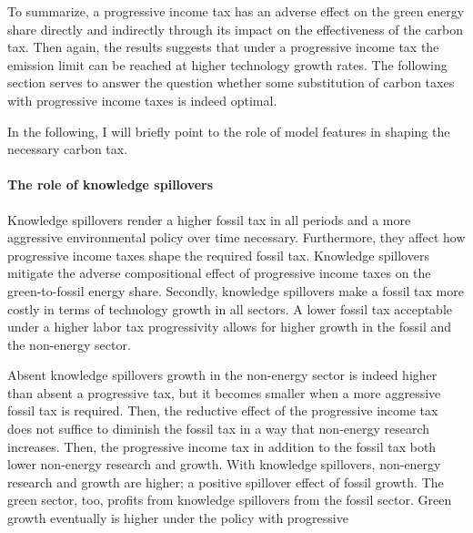 To summarize, a progressive income tax has an adverse effect on the green energy share directly and indirectly through its impact on the effectiveness of the carbon tax.
Then again, the results suggests that under a progressive income tax the emission limit can be reached at higher technology growth rates. 
The following section serves to answer the question whether some substitution of  carbon taxes with progressive income taxes is indeed optimal. 
 
 In the following, I will briefly point to the role of model features in shaping the necessary carbon tax. 

\paragraph{The role of knowledge spillovers}

Knowledge spillovers render a higher fossil tax in all periods and a more aggressive environmental policy over time necessary.
Furthermore, they affect how progressive income taxes shape the required fossil tax. Knowledge spillovers mitigate the adverse compositional effect of progressive income taxes on the green-to-fossil energy share. %
Secondly, knowledge spillovers make a fossil tax more costly in terms of technology growth in all sectors.  A lower fossil tax acceptable under a higher labor tax progressivity allows for higher growth in the fossil and the non-energy sector. 

Absent knowledge spillovers growth in the non-energy sector is indeed higher than absent a progressive tax, but it becomes smaller when a more aggressive fossil tax is required. Then, the reductive effect of the progressive income tax does not suffice to diminish the fossil tax in a way that non-energy research increases. Then, the progressive income tax in addition to the fossil tax both lower non-energy research and growth. With knowledge spillovers, non-energy research and growth are higher; a positive spillover effect of fossil growth. The green sector, too, profits from knowledge spillovers from the fossil sector. Green growth eventually is higher under the policy with progressive 

